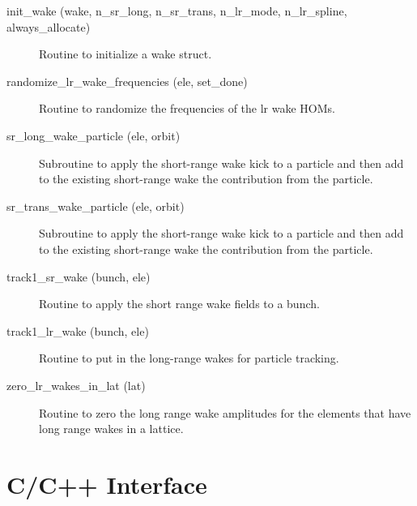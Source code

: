 \begin{description}

\label{r:init.wake}
\item[init_wake (wake, n_sr_long, n_sr_trans, n_lr_mode, n_lr_spline, always_allocate)] \Newline 
Routine to initialize a wake struct.

\label{r:randomize.lr.wake.frequencies}
\item[randomize_lr_wake_frequencies (ele, set_done)] \Newline 
Routine to randomize the frequencies of the lr wake HOMs.

\label{r:sr.long.wake.particle}
\item[sr_long_wake_particle (ele, orbit)] \Newline 
Subroutine to apply the short-range wake kick to a particle and then add 
to the existing short-range wake the contribution from the particle.

\label{r:sr.trans.wake.particle}
\item[sr_trans_wake_particle (ele, orbit)] \Newline 
Subroutine to apply the short-range wake kick to a particle and then add 
to the existing short-range wake the contribution from the particle.

\label{r:track1.sr.wake}
\item[track1_sr_wake (bunch, ele)] \Newline 
Routine to apply the short range wake fields to a bunch. 

\label{r:track1.lr.wake}
\item[track1_lr_wake (bunch, ele)] \Newline 
Routine to put in the long-range wakes for particle tracking.

\label{r:zero.lr.wakes.in.lat}
\item[zero_lr_wakes_in_lat (lat)] \Newline 
Routine to zero the long range wake amplitudes for the elements that have
long range wakes in a lattice.

\end{description}

\section{C/C++ Interface}
\label{r:c.interface}  

